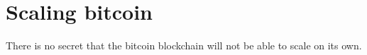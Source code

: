 \section{Scaling bitcoin}

There is no secret that the bitcoin blockchain will not be able to scale on its own. 